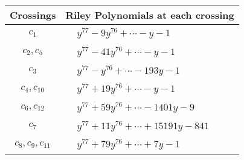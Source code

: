 \documentclass[1p]{elsarticle_modified}
\theoremstyle{definition}
\begin{document}
\begin{tabular}{m{50pt}|m{274pt}}
Crossings & \hspace{64pt}Riley Polynomials at each crossing \\
\hline $$\begin{aligned}c_{1}\end{aligned}$$&$\begin{aligned}
&y^{77}-9 y^{76}+\cdots- y-1
\end{aligned}$\\
\hline $$\begin{aligned}c_{2},c_{5}\end{aligned}$$&$\begin{aligned}
&y^{77}-41 y^{76}+\cdots- y-1
\end{aligned}$\\
\hline $$\begin{aligned}c_{3}\end{aligned}$$&$\begin{aligned}
&y^{77}- y^{76}+\cdots-193 y-1
\end{aligned}$\\
\hline $$\begin{aligned}c_{4},c_{10}\end{aligned}$$&$\begin{aligned}
&y^{77}+19 y^{76}+\cdots- y-1
\end{aligned}$\\
\hline $$\begin{aligned}c_{6},c_{12}\end{aligned}$$&$\begin{aligned}
&y^{77}+59 y^{76}+\cdots-1401 y-9
\end{aligned}$\\
\hline $$\begin{aligned}c_{7}\end{aligned}$$&$\begin{aligned}
&y^{77}+11 y^{76}+\cdots+15191 y-841
\end{aligned}$\\
\hline $$\begin{aligned}c_{8},c_{9},c_{11}\end{aligned}$$&$\begin{aligned}
&y^{77}+79 y^{76}+\cdots+7 y-1
\end{aligned}$\\
\hline
\end{tabular}
\vskip 2pc
\end{document}
